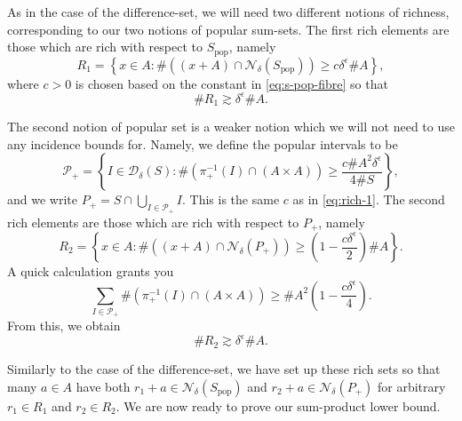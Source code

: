 \documentclass[12pt]{amsart}
\newcommand{\1}{\mathbf{1}}
\begin{document}
As in the case of the difference-set,
we will need two different notions of richness, corresponding to our two notions of popular sum-sets. The
first rich elements are those which are rich with respect to \(S _{\text{pop}} \), namely
\begin{equation} \label{eq:rich-1}
	R_1 = \left\{ x \in A : \# \left( \left( x + A \right) \cap \mathcal{N} _{\delta} (S_{\text{pop}} )	 \right) \geq c \delta^{\epsilon} \# A \right\},
\end{equation}
where \(c > 0\) is chosen based on the constant in \eqref{eq:s-pop-fibre} so that
\[
	\# R_{1} \gtrsim \delta ^{\epsilon} \# A
.\]

The second notion of popular set is a weaker notion
which we will not need to use any incidence bounds for. Namely, we define the popular
intervals to be
\[
	\mathcal{P}_{+} = \left\{ I \in \mathcal{D} _{\delta} (S) : \# \left( \pi_{+}  ^{-1} (I) \cap (A \times A) \right) \geq \frac{c \# A ^{2} \delta^{\epsilon}	}{4 \# S}  \right\} 
,\]
and we write \(P_{+} = S \cap \bigcup _{I \in \mathcal{P} _{+} } I\). This is the same \(c\) as in \eqref{eq:rich-1}.
The second rich elements are those which are rich with respect to \( P_{+} \), namely
\[
	R_2 = \left\{ x \in A : \# \left( (x +  A)\cap \mathcal{N} _{\delta} (P_{+} )   \right) \geq \left( 1 - \frac{c \delta ^{\epsilon}}{2}  \right) \# A \right\} 
.\]
A quick calculation grants you
\[
	\sum _{I \in \mathcal{P} _{+} } \# \left( \pi _{+} ^{-1} (I)\cap (A \times A) \right) \geq \# A ^{2} \left(  1 - \frac{c \delta^{\epsilon}}{4}  \right) 
.\]
From this, we obtain
\[
	\# R_2 \gtrsim \delta^{\epsilon} \# A
.\]

Similarly to the case of the difference-set, we have set up these rich sets so that many \(a \in A\) have both \(r_1 + a \in \mathcal{N} _{\delta} (S_{\text{pop}} ) \) and \(r_2 + a \in \mathcal{N} _{\delta} (P_{+} ) \)
for arbitrary \(r_1 \in R_1\) and \(r_2 \in R_2\). We are now ready to prove our sum-product lower bound.
\end{document}
